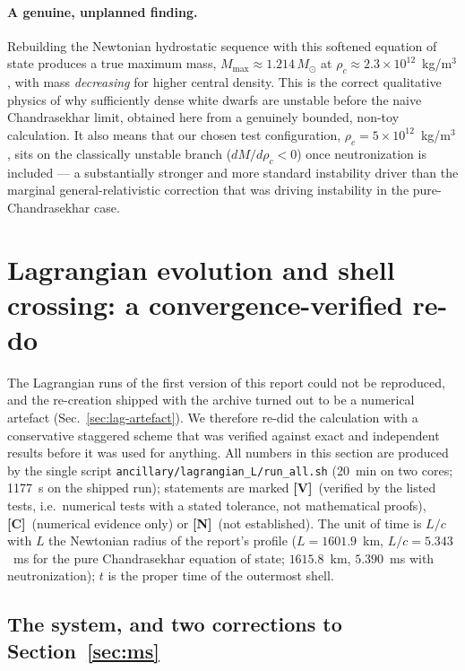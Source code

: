 \documentclass[11pt]{article}
\begin{document}
\paragraph{A genuine, unplanned finding.} Rebuilding the Newtonian hydrostatic sequence with this softened equation of state produces a true maximum mass, $M_{\max}\approx1.214\,M_\odot$ at $\rho_c\approx2.3\times10^{12}$~kg/m$^3$, with mass \emph{decreasing} for higher central density. This is the correct qualitative physics of why sufficiently dense white dwarfs are unstable before the naive Chandrasekhar limit, obtained here from a genuinely bounded, non-toy calculation. It also means that our chosen test configuration, $\rho_c=5\times10^{12}$~kg/m$^3$, sits on the classically unstable branch ($dM/d\rho_c<0$) once neutronization is included --- a substantially stronger and more standard instability driver than the marginal general-relativistic correction that was driving instability in the pure-Chandrasekhar case.

\providecommand{\LP}{\textbf{[V]}}
\providecommand{\LC}{\textbf{[C]}}
\providecommand{\LN}{\textbf{[N]}}

\section{Lagrangian evolution and shell crossing: a convergence-verified re-do}
\label{sec:lagrangian}

The Lagrangian runs of the first version of this report could not be reproduced, and the re-creation shipped with the archive turned out to be a numerical artefact (Sec.~\ref{sec:lag-artefact}).  We therefore re-did the calculation with a conservative staggered scheme that was verified against exact and independent results before it was used for anything.  All numbers in this section are produced by the single script \texttt{ancillary/lagrangian\_L/run\_all.sh} (20~min on two cores; 1177~s on the shipped run); statements are marked \LP\ (verified by the listed tests, i.e.\ numerical tests with a stated tolerance, not mathematical proofs), \LC\ (numerical evidence only) or \LN\ (not established).  The unit of time is $L/c$ with $L$ the Newtonian radius of the report's profile ($L=1601.9$~km, $L/c=5.343$~ms for the pure Chandrasekhar equation of state; $1615.8$~km, $5.390$~ms with neutronization); $t$ is the proper time of the outermost shell.

\subsection{The system, and two corrections to Section~\ref{sec:ms}}
\label{sec:lag-system}
\end{document}
